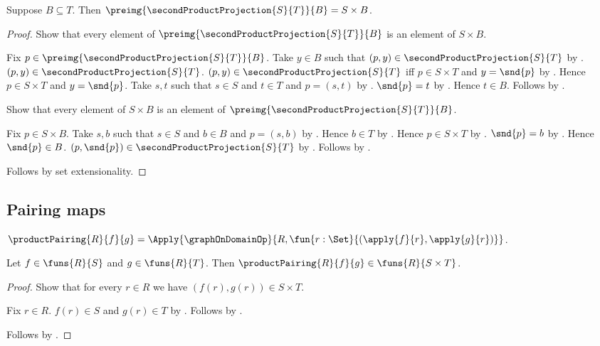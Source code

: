 \begin{proposition}\label{second_product_projection_preimage}
    Suppose $B\subseteq T$.
    Then $\preimg{\secondProductProjection{S}{T}}{B}=S\times B$.
\end{proposition}
\begin{proof}
    Show that every element of
        $\preimg{\secondProductProjection{S}{T}}{B}$ is an element of
        $S\times B$.
    \begin{subproof}
        Fix $p\in\preimg{\secondProductProjection{S}{T}}{B}$.
        Take $y\in B$ such that
            $(p,y)\in\secondProductProjection{S}{T}$ by .
        $(p,y)\in\secondProductProjection{S}{T}$.
        $(p,y)\in\secondProductProjection{S}{T}$ iff
            $p\in S\times T$ and $y=\snd{p}$ by
            .
        Hence $p\in S\times T$ and $y=\snd{p}$.
        Take $s,t$ such that $s\in S$ and $t\in T$ and $p=(s,t)$ by
            .
        $\snd{p}=t$ by .
        Hence $t\in B$.
        Follows by .
    \end{subproof}
    Show that every element of $S\times B$ is an element of
        $\preimg{\secondProductProjection{S}{T}}{B}$.
    \begin{subproof}
        Fix $p\in S\times B$.
        Take $s,b$ such that $s\in S$ and $b\in B$ and $p=(s,b)$ by
            .
        Hence $b\in T$ by .
        Hence $p\in S\times T$ by .
        $\snd{p}=b$ by .
        Hence $\snd{p}\in B$.
        $(p,\snd{p})\in\secondProductProjection{S}{T}$ by
            .
        Follows by .
    \end{subproof}
    Follows by set extensionality.
\end{proof}

\subsection{Pairing maps}

\begin{definition}\label{product_pairing}
    $\productPairing{R}{f}{g}
        =\Apply{\graphOnDomainOp}{
            R,\fun{r:\Set}{(\apply{f}{r},\apply{g}{r})}}$.
\end{definition}

\begin{proposition}\label{product_pairing_type}
    Let $f\in\funs{R}{S}$ and $g\in\funs{R}{T}$.
    Then $\productPairing{R}{f}{g}\in\funs{R}{S\times T}$.
\end{proposition}
\begin{proof}
    Show that for every $r\in R$ we have $(f(r),g(r))\in S\times T$.
    \begin{subproof}
        Fix $r\in R$.
        $f(r)\in S$ and $g(r)\in T$ by .
        Follows by .
    \end{subproof}
    Follows by
        .
\end{proof}

